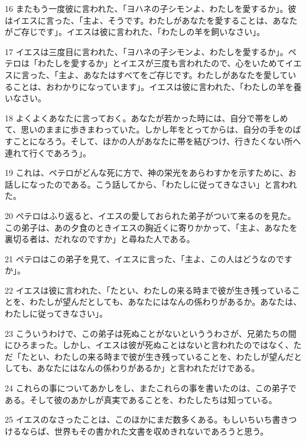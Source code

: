\par 16 またもう一度彼に言われた、「ヨハネの子シモンよ、わたしを愛するか」。彼はイエスに言った、「主よ、そうです。わたしがあなたを愛することは、あなたがご存じです」。イエスは彼に言われた、「わたしの羊を飼いなさい」。
\par 17 イエスは三度目に言われた、「ヨハネの子シモンよ、わたしを愛するか」。ペテロは「わたしを愛するか」とイエスが三度も言われたので、心をいためてイエスに言った、「主よ、あなたはすべてをご存じです。わたしがあなたを愛していることは、おわかりになっています」。イエスは彼に言われた、「わたしの羊を養いなさい。
\par 18 よくよくあなたに言っておく。あなたが若かった時には、自分で帯をしめて、思いのままに歩きまわっていた。しかし年をとってからは、自分の手をのばすことになろう。そして、ほかの人があなたに帯を結びつけ、行きたくない所へ連れて行くであろう」。
\par 19 これは、ペテロがどんな死に方で、神の栄光をあらわすかを示すために、お話しになったのである。こう話してから、「わたしに従ってきなさい」と言われた。
\par 20 ペテロはふり返ると、イエスの愛しておられた弟子がついて来るのを見た。この弟子は、あの夕食のときイエスの胸近くに寄りかかって、「主よ、あなたを裏切る者は、だれなのですか」と尋ねた人である。
\par 21 ペテロはこの弟子を見て、イエスに言った、「主よ、この人はどうなのですか」。
\par 22 イエスは彼に言われた、「たとい、わたしの来る時まで彼が生き残っていることを、わたしが望んだとしても、あなたにはなんの係わりがあるか。あなたは、わたしに従ってきなさい」。
\par 23 こういうわけで、この弟子は死ぬことがないといううわさが、兄弟たちの間にひろまった。しかし、イエスは彼が死ぬことはないと言われたのではなく、ただ「たとい、わたしの来る時まで彼が生き残っていることを、わたしが望んだとしても、あなたにはなんの係わりがあるか」と言われただけである。
\par 24 これらの事についてあかしをし、またこれらの事を書いたのは、この弟子である。そして彼のあかしが真実であることを、わたしたちは知っている。
\par 25 イエスのなさったことは、このほかにまだ数多くある。もしいちいち書きつけるならば、世界もその書かれた文書を収めきれないであろうと思う。


